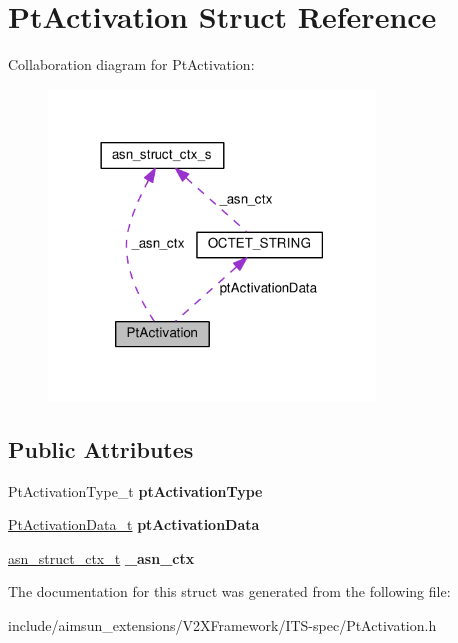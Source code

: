 \hypertarget{structPtActivation}{}\section{Pt\+Activation Struct Reference}
\label{structPtActivation}


Collaboration diagram for Pt\+Activation\+:\nopagebreak
\begin{figure}[H]
\begin{center}
\leavevmode
\includegraphics[width=246pt]{structPtActivation__coll__graph}
\end{center}
\end{figure}
\subsection*{Public Attributes}
\begin{DoxyCompactItemize}
\item 
Pt\+Activation\+Type\+\_\+t {\bfseries pt\+Activation\+Type}\hypertarget{structPtActivation_a5a4d9edbee1b43bf734aaf481ebcd5d1}{}\label{structPtActivation_a5a4d9edbee1b43bf734aaf481ebcd5d1}

\item 
\hyperlink{structOCTET__STRING}{Pt\+Activation\+Data\+\_\+t} {\bfseries pt\+Activation\+Data}\hypertarget{structPtActivation_a695812fd412d6e54995553a4ecfb0598}{}\label{structPtActivation_a695812fd412d6e54995553a4ecfb0598}

\item 
\hyperlink{structasn__struct__ctx__s}{asn\+\_\+struct\+\_\+ctx\+\_\+t} {\bfseries \+\_\+asn\+\_\+ctx}\hypertarget{structPtActivation_a3357cb9c60de27d09b78153e290d2d99}{}\label{structPtActivation_a3357cb9c60de27d09b78153e290d2d99}

\end{DoxyCompactItemize}


The documentation for this struct was generated from the following file\+:\begin{DoxyCompactItemize}
\item 
include/aimsun\+\_\+extensions/\+V2\+X\+Framework/\+I\+T\+S-\/spec/Pt\+Activation.\+h\end{DoxyCompactItemize}
